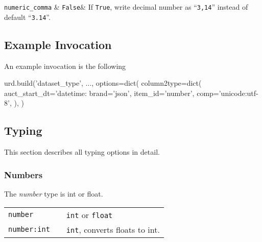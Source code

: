   \RP \texttt{numeric\_comma} & \texttt{False}& If
  \texttt{True}, write decimal number as ``\texttt{3,14}'' instead of
  default ``\texttt{3.14}''.\\[1ex]
\stoptable
  



\clearpage
\subsection{Example Invocation}
An example invocation is the following

\begin{python}
urd.build('dataset_type', ...,
  options=dict(
    column2type=dict(
      auct_start_dt='datetime:%
      brand='json',
      item_id='number',
      comp='unicode:utf-8',
    ),
  )
\end{python}



\subsection{Typing}
This section describes all typing options in detail.

\subsubsection{Numbers}
The \emph{number} type is int or float.
\begin{leftbar}
\begin{tabular}{p{2cm}p{2cm}p{9cm}}
  \texttt{number}     && \texttt{int} or \texttt{float} \\
  \texttt{number:int} && \texttt{int}, converts floats to int.\\
\end{tabular}
\end{leftbar}



